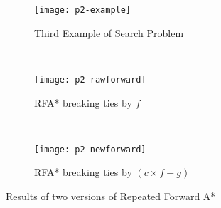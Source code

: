 \begin{figure}[t]
  \centering
  \begin{subfigure}[b]{0.35\textwidth}
    \texttt{[image: p2-example]}
    \caption{Third Example of Search Problem}
    \label{fig:p2-example}
  \end{subfigure}
  ~
  \begin{subfigure}[b]{0.30\textwidth}
    \texttt{[image: p2-rawforward]}
    \caption{RFA* breaking ties by $f$}
    \label{fig:rawforward}
  \end{subfigure}
  ~
  \begin{subfigure}[b]{0.30\textwidth}
    \texttt{[image: p2-newforward]}
    \caption{RFA* breaking ties by $(c\times f-g)$}
    \label{fig:newforward}
  \end{subfigure}
\caption{Results of two versions of Repeated Forward A*}
\end{figure}

